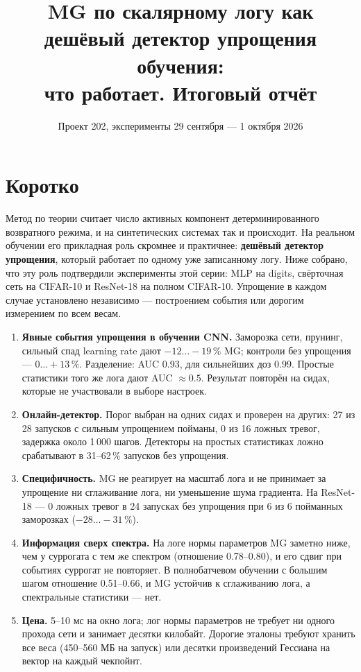 \documentclass[10pt,a4paper]{article}
\title{MG по скалярному логу как дешёвый детектор упрощения обучения:\\
что работает. Итоговый отчёт}
\author{Проект 202, эксперименты 29 сентября --- 1 октября 2026}
\date{}
\newcommand{\good}[1]{\textcolor[HTML]{117733}{#1}}
\begin{document}
\maketitle

\section*{Коротко}

Метод по теории считает число активных компонент детерминированного возвратного
режима, и на синтетических системах так и происходит. На реальном обучении его
прикладная роль скромнее и практичнее: \textbf{дешёвый детектор упрощения}, который
работает по одному уже записанному логу. Ниже собрано, что эту роль подтвердили
эксперименты этой серии: MLP на digits, свёрточная сеть на CIFAR-10 и ResNet-18 на
полном CIFAR-10. Упрощение в каждом случае установлено независимо --- построением
события или дорогим измерением по всем весам.

\begin{enumerate}\setlength\itemsep{2pt}
\item \textbf{Явные события упрощения в обучении CNN.} Заморозка сети, прунинг,
  сильный спад learning rate дают \good{$-12\ldots-19\,\%$} MG; контроли без упрощения
  --- $0\ldots+13\,\%$. Разделение: AUC 0.93, для сильнейших доз 0.99. Простые
  статистики того же лога дают AUC $\approx 0.5$. Результат повторён на сидах,
  которые не участвовали в выборе настроек.
\item \textbf{Онлайн-детектор.} Порог выбран на одних сидах и проверен на других:
  \good{27 из 28} запусков с сильным упрощением пойманы, \good{0 из 16} ложных тревог,
  задержка около 1\,000 шагов. Детекторы на простых статистиках ложно срабатывают в
  31--62\,\% запусков без упрощения.
\item \textbf{Специфичность.} MG не реагирует на масштаб лога и не принимает за
  упрощение ни сглаживание лога, ни уменьшение шума градиента. На ResNet-18 ---
  \good{0 ложных тревог в 24} запусках без упрощения при \good{6 из 6} пойманных
  заморозках ($-28\ldots-31\,\%$).
\item \textbf{Информация сверх спектра.} На логе нормы параметров MG заметно ниже,
  чем у суррогата с тем же спектром (отношение 0.78--0.80), и его сдвиг при событиях
  суррогат не повторяет. В полнобатчевом обучении с большим шагом отношение
  0.51--0.66, и MG устойчив к сглаживанию лога, а спектральные статистики --- нет.
\item \textbf{Цена.} 5--10 мс на окно лога; лог нормы параметров не требует ни
  одного прохода сети и занимает десятки килобайт. Дорогие эталоны требуют хранить
  все веса (450--560 МБ на запуск) или десятки произведений Гессиана на вектор на
  каждый чекпойнт.
\end{enumerate}
\end{document}
